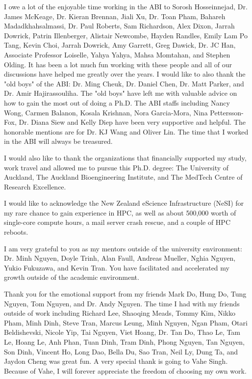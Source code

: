 \begin{acknowledgements}
    
    I owe a lot of the enjoyable time working in the ABI to Sorosh Hosseinnejad, Dr. James McKeage, Dr. Kieran Brennan, Jiali Xu, Dr. Toan Pham, Bahareh Madadkhahsalmassi, Dr. Paul Roberts, Sam Richardson, Alex Dixon, Jarrah Dowrick, Patrin Illenberger, Alistair Newcombe, Hayden Randles, Emily Lam Po Tang, Kevin Choi, Jarrah Dowrick, Amy Garrett, Greg Dawick, Dr. JC Han, Associate Professor Loiselle, Yahya Yahya, Mahsa Momtahan, and Stephen Olding. It has been a lot much fun working with these people and all of our discussions have helped me greatly over the years. I would like to also thank the "old boys" of the ABI: Dr. Ming Cheuk, Dr. Daniel Chen, Dr. Matt Parker, and Dr. Amir Hajirassouliha. The "old boys" have left me with valuable advice on how to gain the most out of doing a Ph.D. The ABI staffs including Nancy Wong, Carmen Balanon, Kosala Krishnan, Nora Garcia-Mora, Nina Pettersson-Fox, Dr. Diana Siew and Kelly Diep have been very supportive and helpful. The honorable mentions are for Dr. KJ Wang and Oliver Lin. The time that I worked in the ABI will always be treasured.
    
    
    I would also like to thank the organizations that financially supported my study, work travel and allowed me to pursue this Ph.D. degree: The University of Auckland, The Auckland Bioengineering Institute, and The MedTech Centre of Research Excellence. 
    
    
    I would like to acknowledge the New Zealand eScience Infrastructure (NeSI) for my rare chance to gain experience in HPC, as well as about 500,000 worth of single-core compute hours, a mail server crash rescue, and a couple of HPC reboots.
    
    
    I am very grateful to you as my mentors outside of the university environment: Dr. Minh Nguyen, Doyle Trinh, Alan Faull, Andreas Mueller, Nghia Nguyen, Yukio Fukuzawa, and Kevin Tran. You have facilitated and accelerated my growth outside of the academic environment.
    
    
    Thank you for the emotional support from my friends Mark Do, Hung Do, Tung Nguyen, Tom Nguyen, and Dr. Andy Nguyen. The time I had with my friends outside of work including Richard Lee, Shaoqing Meads, Tommy Kim, Nikko Pham, Minh Dinh, Steve Tran, Marcus Leung, Minh Nguyen, Ngan Pham, Otari Beldishevski, Nicole Yip, Tai Nguyen, Viet Hoang, Dr. Tan Do, Thao Le, Tam Le, Hoang Le, Anh Phan, Tuan Dinh, Tram Dinh, Phong Nguyen, Tan Nguyen, Son Dinh, Vincent Ho, Long Dao, Bella Du, Sao Tran, Neil Ly, Dung Ta, and Jaydon Cheng was great fun. A very special thank is going to Vahe Singh. Because of Vahe, I will forever appreciate the freedom of choosing my own work.
    

\end{acknowledgements}
